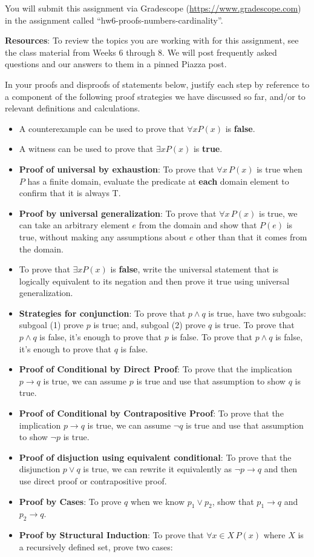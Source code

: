 \documentclass[12pt, oneside]{article}
\begin{document}
You will submit this assignment via Gradescope
(\href{https://www.gradescope.com}{https://www.gradescope.com}) 
in the assignment called ``hw6-proofs-numbers-cardinality''.

{\bf Resources}: To review the topics you are working with 
for this assignment, see the class material from Weeks 6 through 8.
We will post frequently asked questions and our answers to them in a 
pinned Piazza post.


In your proofs and disproofs of statements below, justify each  step
by reference to  a component of the  following proof  strategies
we  have discussed so far, and/or to relevant definitions and calculations.
\begin{itemize}
    \item A counterexample can be used to prove that  $\forall x P(x)$ is {\bf false}.
    \item  A witness can be used to prove that  $\exists x P(x)$ is {\bf true}.
    \item {\bf Proof of universal by exhaustion}: To prove that $\forall x \, P(x)$
is true when $P$ has a finite domain, evaluate the predicate at {\bf each} domain element to confirm that it is always T.
    \item  {\bf Proof by universal generalization}: To prove that $\forall x \, P(x)$
is true, we can take an arbitrary element $e$ from the domain and show that $P(e)$ is true, without making any assumptions 
about $e$ other than that it comes from the domain.
    \item To  prove  that $\exists x P(x)$ is {\bf false}, write the universal statement that is 
    logically equivalent to its negation and then prove it true using universal generalization.
    \item {\bf Strategies for conjunction}: To prove that $p \land q$ is true, have two subgoals: 
    subgoal (1) prove $p$ 
is  true; and, subgoal (2) prove $q$ is true. To prove that $p \land q$ is false, it's enough to prove that $p$ is false.
 To prove that $p \land q$ is false, it's enough to prove that $q$ is false.
    \item {\bf Proof of Conditional by Direct Proof}: To prove that the implication $p \to q$ is true, 
    we can assume $p$ is true and use that assumption to show $q$ is true.
    \item {\bf Proof of Conditional by Contrapositive Proof}: To prove that the implication $p \to q$ is true, 
    we can assume $\neg q$ is true and use that assumption to show $\neg p$ is true.
    \item {\bf Proof of disjuction using equivalent conditional}: To prove that the 
    disjunction $p \lor q$ is true, we can rewrite it equivalently as $\lnot p \to q$ and
    then use direct proof or contrapositive proof.
    \item {\bf Proof by Cases}: To prove $q$ when we know $p_1 \lor p_2$, show that $p_1 \to q$ and $p_2 \to q$.
    \item
    {\bf Proof by Structural Induction}: To prove that $\forall x \in X \, P(x)$ where $X$ is a recursively defined set, prove two cases:
        

\end{itemize}
\end{document}
